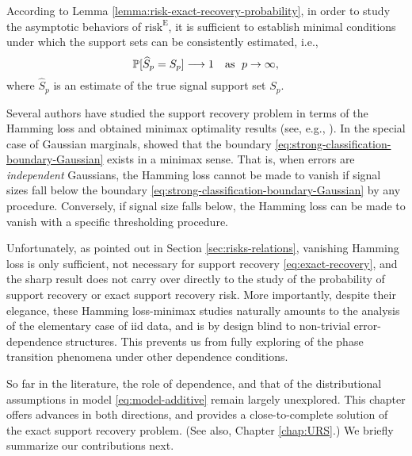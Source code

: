 According to Lemma \ref{lemma:risk-exact-recovery-probability}, in order to study the asymptotic behaviors of $\mathrm{risk}^{\mathrm{E}}$, it is sufficient to establish minimal conditions under which the support sets can be consistently estimated, i.e.,
\begin{equation} \label{eq:exact-recovery} 
    \P[\widehat{S}_p = S_p] \longrightarrow 1 \quad \text{as } \; p\to\infty, 
\end{equation}
where $\widehat{S}_p$ is an estimate of the true signal support set $S_p$.

\medskip

Several authors have studied the support recovery problem in terms of the Hamming loss and obtained minimax optimality results (see, e.g., \cite{ji2012ups, genovese2012comparison, jin2014optimality, butucea2018variable}).
In the special case of Gaussian marginals, \cite{butucea2018variable} showed that the boundary \eqref{eq:strong-classification-boundary-Gaussian} exists in a minimax sense.
That is, when errors are \emph{independent} Gaussians, the Hamming loss cannot be made to vanish if signal sizes fall below the boundary \eqref{eq:strong-classification-boundary-Gaussian} by any procedure. 
Conversely, if signal size falls below, the Hamming loss can be made to vanish with a specific thresholding procedure.

Unfortunately, as pointed out in Section \ref{sec:risks-relations}, vanishing Hamming loss is only sufficient, not necessary for support recovery \eqref{eq:exact-recovery}, and the sharp result does not carry over directly to the study of the probability of support recovery or exact support recovery risk.
More importantly, despite their elegance, these Hamming loss-minimax studies naturally amounts to the analysis of the elementary case of iid data, and is by design blind to non-trivial error-dependence structures.
This prevents us from fully exploring of the phase transition phenomena under other dependence conditions.

So far in the literature, the role of dependence, and that of the distributional assumptions in model \eqref{eq:model-additive} remain largely unexplored.  
This chapter offers advances in both directions, and provides a close-to-complete solution of the exact support recovery problem. (See also, Chapter \ref{chap:URS}.)
We briefly summarize our contributions next.


